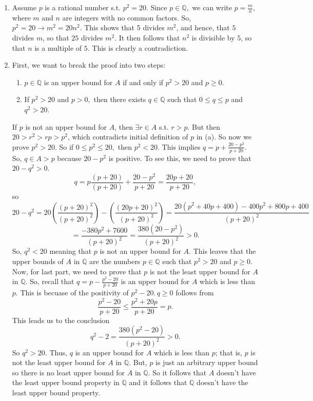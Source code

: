 \documentclass[12pt,letterpaper,boxed]{hmcpset}
\begin{document}
\begin{solution}
\vspace{-2mm}
\begin{enumerate}
	\itemsep0em
	\item Assume $p$ is a rational number s.t. $p^{2}=20.$ Since $p\in\mathbb{Q},$ we can write $p = \frac{m}{n},$ where $m$ and $n$ are integers with no common factors. So, $p^{2}=20 \rightarrow m^{2}=20n^{2}.$ This shows that 5 divides $m^2$, and hence, that $5$ divides $m$, so that $25$ divides $m^2.$ It then follows that $n^2$ is divisible by $5$, so that $n$ is a multiple of $5$. This is clearly a contradiction.
	\item First, we want to break the proof into two steps:
	\begin{enumerate}
	\itemsep0em
	\item $p\in \mathbb{Q}$ is an upper bound for $A$ if and only if $p^{2} > 20$ and $p \ge 0.$
	\item If $p^{2} > 20$ and $p > 0,$ then there exists $q \in \mathbb{Q}$ such that $0 \leq q \leq p$ and $q^{2}>20$.
	\end{enumerate}
	If $p$ is not an upper bound for $A$, then $\exists r\in A$ s.t. $r > p$. But then $20 > r^{2} > rp > p^{2}$, which contradicts initial definition of $p$ in (a). So now we prove $p^{2}>20.$ So if $0 \leq p^{2} \leq 20,$ then $p^{2}<20.$ This implies $q=p + \frac{20 - p^{2}}{p + 20}$. So, $q\in A > p$ because $20 - p^{2}$ is positive. To see this, we need to prove that $20 - q^{2} > 0$. $$ q = p\frac{(p + 20)}{(p +20)} + \frac{20 - p^{2}}{p + 20} = \frac{20p + 20}{p + 20},$$ so $$ 20 - q^{2} = 20(\frac{(p + 20)^{2}}{(p + 20)^{2}}) -  (\frac{(20p + 20)^{2}}{(p + 20)^{2}}) = \frac{20(p^{2} + 40p + 400) - 400p^{2} + 800p+400}{(p + 20)^{2}}$$ $$=\frac{-380p^{2} + 7600}{(p + 20)^{2}}= \frac{380(20 - p^{2})}{(p + 20)^{2}} > 0.$$
	So, $q^{2} < 20$ meaning that $p$ is not an upper bound for $A$. This leaves that the upper bounds of $A$ in $\mathbb{Q}$ are the numbers $p\in\mathbb{Q}$ such that $p^{2}>20$ and $p \ge 0.$ \\ Now, for last part, we need to prove that $p$ is not the least upper bound for $A$ in $\mathbb{Q}.$ So, recall that $q = p - \frac{p^{2} - 20}{p + 20}$ is an upper bound for $A$ which is less than $p$. This is becuase of the positivity of $p^{2} - 20.\, q \ge 0$ follows from $$ \frac{p^{2} - 20}{p + 20} \leq \frac{p^{2} + 20p}{p + 20}=p.$$ This leads us to the conclusion $$q^{2} - 2 = \frac{380(p^{2} - 20)}{(p + 20)^{2}} > 0.$$ So $q^{2}>20.$ Thus, $q$ is an upper bound for $A$ which is less than $p$; that is, $p$ is not the least upper bound for $A$ in $\mathbb{Q}.$ But, $p$ is just an arbitrary upper bound so there is no least upper bound for $A$ in $\mathbb{Q}$. So it follows that $A$ doesn't have the least upper bound property in $\mathbb{Q}$ and it follows that $\mathbb{Q}$ doesn't have the least upper bound property.
\end{enumerate}
\end{solution}
\end{document}

